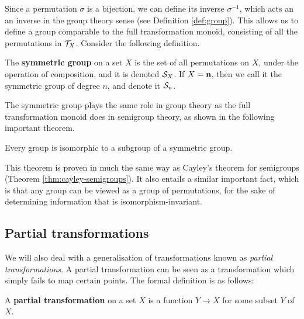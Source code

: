Since a permutation $\sigma$ is a bijection, we can define its inverse
$\sigma^{-1}$, which acts an an inverse in the group theory sense (see
Definition \ref{def:group}).  This allows us to define a group comparable to the
full transformation monoid, consisting of all the permutations in $\mathcal{T}_X$.
Consider the following definition.

\begin{definition}
  \label{def:sn}
  The \textbf{symmetric group} on a set $X$ is the set of all permutations on
  $X$, under the operation of composition, and it is denoted $\mathcal{S}_X$.  If
  $X = \mathbf{n}$, then we call it the symmetric group of degree $n$, and denote it
  $\mathcal{S}_n$.
\end{definition}

The symmetric group plays the same role in group theory as the full
transformation monoid does in semigroup theory, as shown in the following
important theorem.

\begin{theorem}
  \label{thm:cayley-groups}
  Every group is isomorphic to a subgroup of a symmetric group.
\end{theorem}

This theorem is proven in much the same way as Cayley's theorem for semigroups
(Theorem \ref{thm:cayley-semigroups}).  It also entails a similar important
fact, which is that any group can be viewed as a group of permutations, for the
sake of determining information that is isomorphism-invariant.

\subsection{Partial transformations}
\label{sec:partial-transformations}

We will also deal with a generalisation of transformations known as
\textit{partial transformations}.  A partial transformation can be seen as a
transformation which simply fails to map certain points.  The formal definition
is as follows:

\begin{definition}
  \label{def:partial-transformation}
  A \textbf{partial transformation} on a set $X$ is a function $Y \to X$ for
  some subset $Y$ of $X$.
\end{definition}

